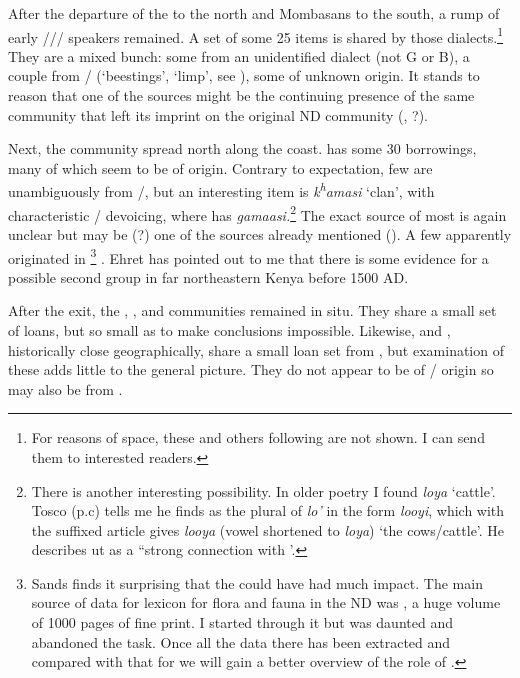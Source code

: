 \documentclass[output=paper
,newtxmath
,modfonts
,nonflat]{langsci/langscibook}
\begin{document}
  After the departure of the  to the north and Mombasans to the south, a rump of early /// speakers remained.  A set of some 25 items is shared by those dialects.\footnote{For reasons of space, these and others following are not shown. I can send them to interested readers.}  They are a mixed bunch: some from an unidentified  dialect (not G or B), a couple from / (‘beestings’, ‘limp’, see ), some of unknown origin. It stands to reason that one of the sources might be the continuing presence of the same  community that left its imprint on the original ND community (, ?).

  Next, the  community spread north along the coast.  has some 30 borrowings, many of which seem to be of  origin. Contrary to expectation, few are unambiguously from /, but an interesting item is \textit{k\textsuperscript{h}}\textit{amasi} ‘clan’, with characteristic / devoicing, where  has \textit{gamaasi.}\footnote{There is another interesting possibility. In older  poetry I found \textit{loya} ‘cattle’. Tosco (p.c) tells me he finds as the plural of \textit{lo’} in  the form \textit{looyi}, which with the suffixed article gives \textit{looya} (vowel shortened to  \textit{loya}) ‘the cows/cattle’. He describes ut as a “strong connection with ’.} The exact  source of most is again unclear but may be (?) one of the sources already mentioned (). A few apparently originated in \footnote{Sands finds it surprising that the  could have had much impact. The main source of data for lexicon for flora and fauna in the ND was \citet{Sacleux1939}, a huge volume of 1000 pages of fine print. I started through it but was daunted and abandoned the task. Once all the data there has been extracted and compared with that for  we will gain a better overview of the role of .} . Ehret has pointed out to me that there is some evidence for a possible second  group in far northeastern Kenya before 1500 AD. 

  After the  exit, the , , and  communities remained in situ. They share a small set of loans, but so small as to make conclusions impossible. Likewise,  and , historically close geographically, share a small loan set from , but examination of these adds little to the general picture. They do not appear to be of / origin so may also be from . 
\end{document}
